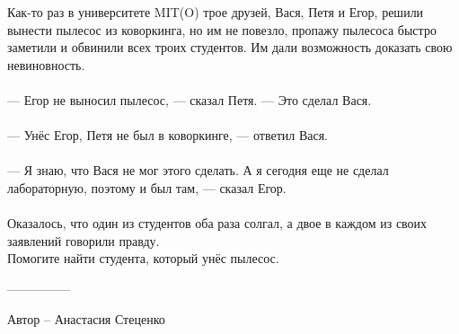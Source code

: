 \question
Как-то раз в университете MIT(O) трое друзей, Вася, Петя и Егор, решили вынести пылесос из коворкинга, но им не повезло, пропажу пылесоса быстро заметили и обвинили всех троих студентов. Им дали возможность доказать свою невиновность.
\\
\\
--- Егор не выносил пылесос, --- сказал Петя. --- Это сделал Вася.
\\
\\
--- Унёс Егор, Петя не был в коворкинге, --- ответил Вася.
\\
\\
--- Я знаю, что Вася не мог этого сделать. А я сегодня еще не сделал лабораторную, поэтому и был там, --- сказал Егор.
\\
\\
Оказалось, что один из студентов оба раза солгал, а двое в каждом из своих заявлений говорили правду.
\\
Помогите найти студента, который унёс пылесос.

---------------

Автор -- Анастасия Стеценко